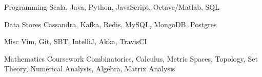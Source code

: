 

\begin{cvskills}

  \cvskill
    {Programming} %
    {Scala, Java, Python, JavaScript, Octave/Matlab, SQL} %

  \cvskill
    {Data Stores} %
    {Cassandra, Kafka, Redis, MySQL, MongoDB, Postgres}

  \cvskill
    {Misc} %
    {Vim, Git, SBT, IntelliJ, Akka, TravisCI} %
    
  \cvskill
    {Mathematics Coursework} %
    {Combinatorics, Calculus, Metric Spaces, Topology, Set Theory, Numerical Analysis, Algebra, Matrix Analysis} %

\end{cvskills}